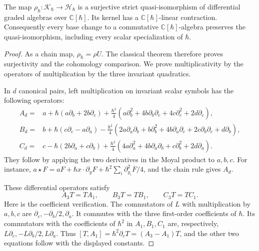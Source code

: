 \begin{theorem}\label{thm:vol2-quantum-rank-two-restriction}
The map $\rho_\hbar:\mathcal K_\hbar\to\mathcal H_\hbar$ is
a surjective strict quasi-isomorphism of differential graded
algebras over $\mathbb C[\hbar]$. Its kernel has a
$\mathbb C[\hbar]$-linear contraction. Consequently every base
change to a commutative $\mathbb C[\hbar]$-algebra preserves the quasi-isomorphism,
including every scalar specialization of $\hbar$.
\end{theorem}

\begin{proof}
As a chain map, $\rho_\hbar=\rho U$. The classical theorem
therefore proves surjectivity and the cohomology comparison.
We prove multiplicativity by the operators of multiplication
by the three invariant quadratics.

In $d$ canonical pairs, left multiplication on invariant scalar
symbols has the following operators:
\begin{align*}
 A_d={}&a+\hbar(a\partial_b+2b\partial_c)
   +\frac{\hbar^2}{4}
      (a\partial_b^2+4b\partial_b\partial_c
                    +4c\partial_c^2+2d\partial_c),\\
 B_d={}&b+\hbar(c\partial_c-a\partial_a)
   -\frac{\hbar^2}{4}
      (2a\partial_a\partial_b+b\partial_b^2
         +4b\partial_a\partial_c+2c\partial_b\partial_c
         +d\partial_b),\\
 C_d={}&c-\hbar(2b\partial_a+c\partial_b)
   +\frac{\hbar^2}{4}
      (4a\partial_a^2+4b\partial_a\partial_b
                       +c\partial_b^2+2d\partial_a).
\end{align*}
They follow by applying the two derivatives in the Moyal
product to $a,b,c$. For instance,
$a\star F=aF+\hbar x\cdot\partial_yF
 +\hbar^2\sum_i\partial_{y_i}^2F/4$,
and the chain rule gives $A_d$.

These differential operators satisfy
\begin{equation}\label{eq:vol2-rank-two-radial-intertwiners}
 A_3T=TA_1,\qquad B_3T=TB_1,\qquad C_3T=TC_1.
\end{equation}
Here is the coefficient verification. The commutators of $L$
with multiplication by $a,b,c$ are
$\partial_c,-\partial_b/2,\partial_a$.
It commutes with the three first-order coefficients of $\hbar$.
Its commutators with the coefficients of $\hbar^2$ in
$A_1,B_1,C_1$ are, respectively,
$L\partial_c,-L\partial_b/2,L\partial_a$.
Thus $[T,A_1]=\hbar^2\partial_cT=(A_3-A_1)T$,
and the other two equations follow with the displayed constants.


\end{proof}
